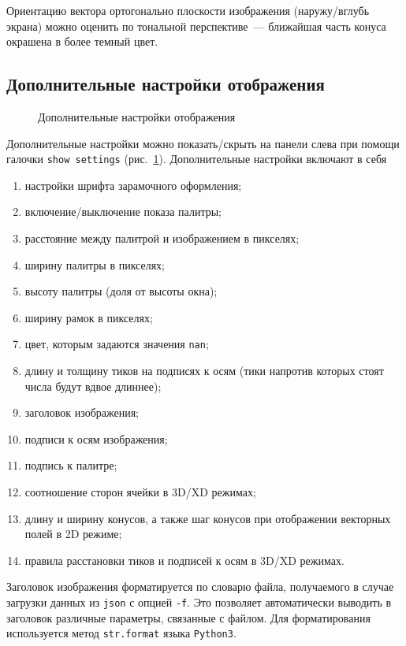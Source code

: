 \documentclass[12pt]{article}
\begin{document}
Ориентацию вектора ортогонально плоскости изображения (наружу/вглубь экрана) можно оценить по тональной перспективе~---
ближайшая часть конуса окрашена в более темный цвет.


\subsection{Дополнительные настройки отображения}
\begin{figure}[h]
  \begin{center}
  \end{center}
  \caption{Дополнительные настройки отображения}\label{settings:pict}
\end{figure}
Дополнительные настройки можно показать/скрыть на панели слева при помощи галочки \verb'show settings' (рис.~\ref{settings:pict}).
Дополнительные настройки включают в себя
\begin{enumerate}
\item настройки шрифта зарамочного оформления;
\item включение/выключение показа палитры;
\item расстояние между палитрой и изображением в пикселях;
\item ширину палитры в пикселях;
\item высоту палитры (доля от высоты окна);
\item ширину рамок в пикселях;
\item цвет, которым задаются значения \verb'nan';
\item длину и толщину тиков на подписях к осям (тики напротив которых стоят числа будут  вдвое длиннее);
\item заголовок изображения;
\item подписи к осям изображения;
\item подпись к палитре;
\item соотношение сторон ячейки в 3D/XD режимах;
\item длину и ширину конусов, а также шаг конусов при отображении векторных полей в 2D режиме;
\item правила расстановки тиков и подписей к осям в 3D/XD режимах.
\end{enumerate}

Заголовок изображения форматируется по словарю файла, получаемого в случае загрузки данных из \verb'json' с опцией \verb'-f'.
Это позволяет автоматически выводить в заголовок различные параметры, связанные с файлом. Для форматирования используется
метод \verb'str.format' языка \verb'Python3'.
\end{document}

